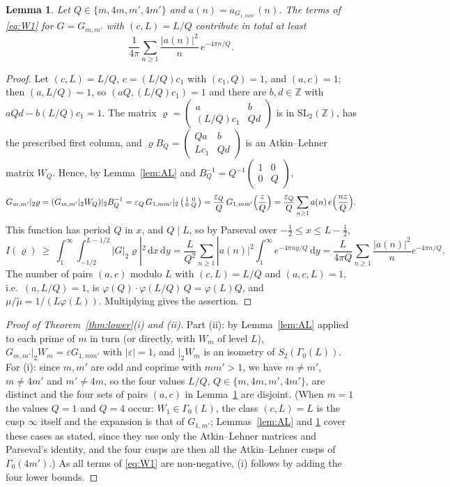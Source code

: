 ﻿\documentclass[11pt]{amsart}
\newtheorem{lemma}[theorem]{Lemma}
\theoremstyle{remark}
\newcommand{\Z}{\mathbb{Z}}
\newcommand{\e}{\varepsilon}
\newcommand{\dd}{\mathrm{d}}
\begin{document}
\begin{lemma}\label{lem:region}
Let $Q\in\{m,4m,m',4m'\}$ and $a(n)=a_{G_{1,mm'}}(n)$. The terms of \eqref{eq:W1} for $G=G_{m,m'}$ with $(c,L)=L/Q$ contribute in total at least
\[
\frac1{4\pi}\sum_{n\ge1}\frac{|a(n)|^2}{n}\,e^{-4\pi n/Q}.
\]
\end{lemma}
\begin{proof}
Let $(c,L)=L/Q$, $c=(L/Q)c_1$ with $(c_1,Q)=1$, and $(a,c)=1$; then $(a,L/Q)=1$, so $(aQ,(L/Q)c_1)=1$ and there are $b,d\in\Z$ with $aQd-b(L/Q)c_1=1$. The matrix $\varrho=\left(\begin{smallmatrix}a&b\\(L/Q)c_1&Qd\end{smallmatrix}\right)$ is in $\mathrm{SL}_2(\Z)$, has the prescribed first column, and $\varrho B_Q=\left(\begin{smallmatrix}Qa&b\\Lc_1&Qd\end{smallmatrix}\right)$ is an Atkin--Lehner matrix $W_Q$. Hence, by Lemma~\ref{lem:AL} and $B_Q^{-1}=Q^{-1}\left(\begin{smallmatrix}1&0\\0&Q\end{smallmatrix}\right)$,
\[
G_{m,m'}|_2\varrho=(G_{m,m'}|_2W_Q)|_2B_Q^{-1}=\e_Q\,G_{1,mm'}|_2\left(\begin{smallmatrix}1&0\\0&Q\end{smallmatrix}\right)=\frac{\e_Q}{Q}\,G_{1,mm'}\Bigl(\frac zQ\Bigr)=\frac{\e_Q}{Q}\sum_{n\ge1}a(n)\,e\Bigl(\frac{nz}{Q}\Bigr).
\]
This function has period $Q$ in $x$, and $Q\mid L$, so by Parseval over $-\frac12\le x\le L-\frac12$,
\[
I(\varrho)\ \ge\ \int_1^\infty\int_{-1/2}^{L-1/2}|G|_2\varrho|^2\,\dd x\,\dd y=\frac{L}{Q^2}\sum_{n\ge1}|a(n)|^2\int_1^\infty e^{-4\pi ny/Q}\,\dd y=\frac{L}{4\pi Q}\sum_{n\ge1}\frac{|a(n)|^2}{n}e^{-4\pi n/Q}.
\]
The number of pairs $(a,c)$ modulo $L$ with $(c,L)=L/Q$ and $(a,c,L)=1$, i.e.\ $(a,L/Q)=1$, is $\varphi(Q)\cdot\varphi(L/Q)\,Q=\varphi(L)Q$, and $\mu/\tilde\mu=1/(L\varphi(L))$. Multiplying gives the assertion.
\end{proof}

\begin{proof}[Proof of Theorem~\ref{thm:lower}(i) and (ii)]
Part (ii): by Lemma~\ref{lem:AL} applied to each prime of $m$ in turn (or directly, with $W_m$ of level $L$), $G_{m,m'}|_2W_m=\varepsilon G_{1,mm'}$ with $|\varepsilon|=1$, and $|_2W_m$ is an isometry of $S_2(\Gamma_0(L))$. For (i): since $m,m'$ are odd and coprime with $mm'>1$, we have $m\ne m'$, $m\ne4m'$ and $m'\ne4m$, so the four values $L/Q$, $Q\in\{m,4m,m',4m'\}$, are distinct and the four sets of pairs $(a,c)$ in Lemma~\ref{lem:region} are disjoint. (When $m=1$ the values $Q=1$ and $Q=4$ occur: $W_1\in\Gamma_0(L)$, the class $(c,L)=L$ is the cusp $\infty$ itself and the expansion is that of $G_{1,m'}$; Lemmas~\ref{lem:AL} and \ref{lem:region} cover these cases as stated, since they use only the Atkin--Lehner matrices and Parseval's identity, and the four cusps are then all the Atkin--Lehner cusps of $\Gamma_0(4m')$.) As all terms of \eqref{eq:W1} are non-negative, (i) follows by adding the four lower bounds.
\end{proof}
\end{document}
